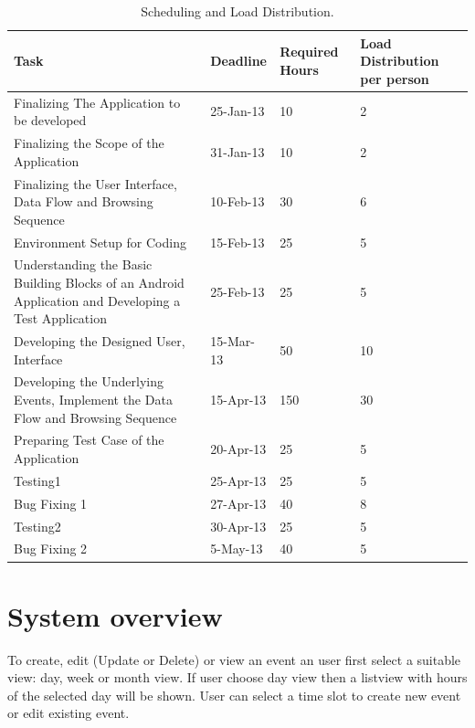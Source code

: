 \documentclass[10pt,a4paper]{report}
\begin{document}
\begin{center}
\begin{table}[h]\footnotesize
  \begin{tabular}{| p{5cm}  | p{2cm} | p{2cm} | p{2cm} |}
  

    \hline
    \textbf{Task}  & \textbf{Deadline} & \textbf{Required Hours} & \textbf{Load Distribution per person} \\ \hline
    Finalizing The Application to be developed & 25-Jan-13  & 10 &2\\ \hline
    Finalizing the Scope of the Application& 31-Jan-13 &10  &2 \\ \hline
    Finalizing the User Interface, Data Flow and Browsing Sequence	& 10-Feb-13 & 30 &6\\ \hline
    Environment Setup for Coding &15-Feb-13  & 25 &5 \\ \hline
    Understanding the Basic Building Blocks of an Android Application and Developing a Test Application &25-Feb-13 &25 &5\\ \hline
    Developing the Designed User, Interface &15-Mar-13  &50  &10 \\ \hline
    Developing the Underlying Events, Implement the Data Flow and Browsing Sequence &15-Apr-13  & 150  &30\\ \hline
    Preparing Test Case of the Application & 20-Apr-13 & 25 & 5 \\ \hline
    Testing1 & 25-Apr-13 & 25&5 \\ \hline
    Bug Fixing 1& 27-Apr-13 &40   &8  \\ \hline
    Testing2 & 30-Apr-13  & 25 &5  \\ \hline
    Bug Fixing 2 & 5-May-13   &40   &5 \\ \hline
      
  \end{tabular}
   \caption{Scheduling and Load Distribution.}
    \label{comparison}  
  \end{table}
\end{center}
\chapter{System overview}
To create, edit (Update or Delete) or view an event an user first select a suitable view: day, week or month view. If user choose day view then a listview with hours of the selected day will be shown. User can select a time slot to create new event or edit existing event.
\end{document}
